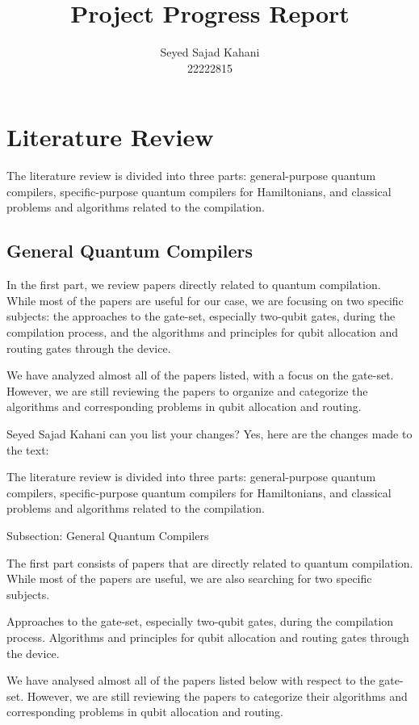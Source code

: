 \documentclass{article}
\title{Project Progress Report}
\author{Seyed Sajad Kahani \\ 22222815}
\begin{document}
\maketitle

\nocite{*}

\section{Literature Review}

The literature review is divided into three parts: general-purpose quantum compilers, specific-purpose quantum compilers for Hamiltonians, and classical problems and algorithms related to the compilation.

\subsection{General Quantum Compilers}

In the first part, we review papers directly related to quantum compilation. While most of the papers are useful for our case, we are focusing on two specific subjects: the approaches to the gate-set, especially two-qubit gates, during the compilation process, and the algorithms and principles for qubit allocation and routing gates through the device.

We have analyzed almost all of the papers listed, with a focus on the gate-set. However, we are still reviewing the papers to organize and categorize the algorithms and corresponding problems in qubit allocation and routing.




Seyed Sajad Kahani
can you list your changes?
Yes, here are the changes made to the text:

The literature review is divided into three parts: general-purpose quantum compilers, specific-purpose quantum compilers for Hamiltonians, and classical problems and algorithms related to the compilation.

Subsection: General Quantum Compilers

The first part consists of papers that are directly related to quantum compilation. While most of the papers are useful, we are also searching for two specific subjects.

Approaches to the gate-set, especially two-qubit gates, during the compilation process.
Algorithms and principles for qubit allocation and routing gates through the device.

We have analysed almost all of the papers listed below with respect to the gate-set. However, we are still reviewing the papers to categorize their algorithms and corresponding problems in qubit allocation and routing.
\end{document}
